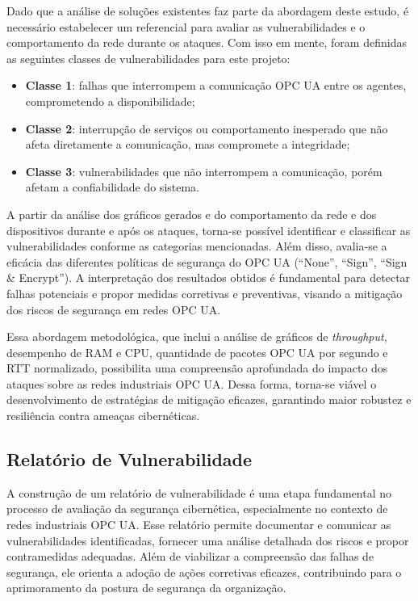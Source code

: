         Dado que a análise de soluções existentes faz parte da abordagem deste estudo, é necessário estabelecer um referencial para avaliar as vulnerabilidades e o comportamento da rede durante os ataques. Com isso em mente, foram definidas as seguintes classes de vulnerabilidades para este projeto:
        
        \begin{itemize}
            \item \textbf{Classe 1}: falhas que interrompem a comunicação OPC UA entre os agentes, comprometendo a disponibilidade;
            \item \textbf{Classe 2}: interrupção de serviços ou comportamento inesperado que não afeta diretamente a comunicação, mas compromete a integridade;
            \item \textbf{Classe 3}: vulnerabilidades que não interrompem a comunicação, porém afetam a confiabilidade do sistema.
        \end{itemize}
        
        A partir da análise dos gráficos gerados e do comportamento da rede e dos dispositivos durante e após os ataques, torna-se possível identificar e classificar as vulnerabilidades conforme as categorias mencionadas. Além disso, avalia-se a eficácia das diferentes políticas de segurança do OPC UA (``None'', ``Sign'', ``Sign \& Encrypt''). A interpretação dos resultados obtidos é fundamental para detectar falhas potenciais e propor medidas corretivas e preventivas, visando a mitigação dos riscos de segurança em redes OPC UA.
        
        Essa abordagem metodológica, que inclui a análise de gráficos de \textit{throughput}, desempenho de RAM e CPU, quantidade de pacotes OPC UA por segundo e RTT normalizado, possibilita uma compreensão aprofundada do impacto dos ataques sobre as redes industriais OPC UA. Dessa forma, torna-se viável o desenvolvimento de estratégias de mitigação eficazes, garantindo maior robustez e resiliência contra ameaças cibernéticas.
    
    
    \subsection{Relatório de Vulnerabilidade}

        A construção de um relatório de vulnerabilidade é uma etapa fundamental no processo de avaliação da segurança cibernética, especialmente no contexto de redes industriais OPC UA. Esse relatório permite documentar e comunicar as vulnerabilidades identificadas, fornecer uma análise detalhada dos riscos e propor contramedidas adequadas. Além de viabilizar a compreensão das falhas de segurança, ele orienta a adoção de ações corretivas eficazes, contribuindo para o aprimoramento da postura de segurança da organização.


